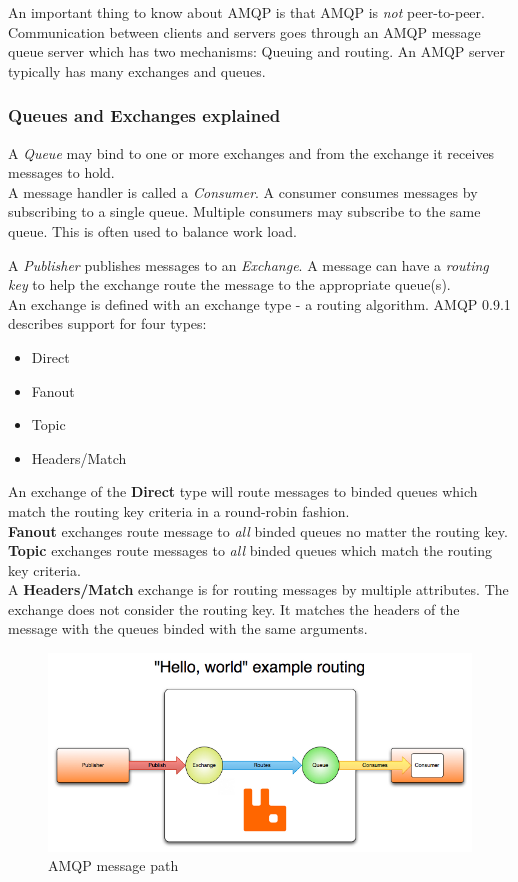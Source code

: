 An important thing to know about AMQP is that AMQP is \textit{not} peer-to-peer. Communication between clients and servers goes through an AMQP message queue server which has two mechanisms: Queuing and routing. An AMQP server typically has many exchanges and queues.
\subsubsection{Queues and Exchanges explained}
A \textit{Queue} may bind to one or more exchanges and from the exchange it receives messages to hold.\\
A message handler is called a \textit{Consumer}. A consumer consumes messages by subscribing to a single queue. Multiple consumers may subscribe to the same queue. This is often used to balance work load.

A \textit{Publisher} publishes messages to an \textit{Exchange}. A message can have a \textit{routing key} to help the exchange route the message to the appropriate queue(s).\\
An exchange is defined with an exchange type - a routing algorithm. AMQP 0.9.1 describes support for four types\cite{Amqp091References}:
\begin{itemize}
\item Direct
\item Fanout
\item Topic
\item Headers/Match
\end{itemize}
An exchange of the \textbf{Direct} type will route messages to binded queues which match the routing key criteria in a round-robin fashion.\\
\textbf{Fanout} exchanges route message to \textit{all} binded queues no matter the routing key.\\
\textbf{Topic} exchanges route messages to \textit{all} binded queues which match the routing key criteria.\\
A \textbf{Headers/Match} exchange is for routing messages by multiple attributes. The exchange does not consider the routing key. It matches the headers of the message with the queues binded with the same arguments\cite{AmqpConcepts}.
\begin{figure}[H]
  \includegraphics[width=\textwidth]{illustrations/publisher-exchange-queue-consumer.png}
  \caption{AMQP message path\cite{AmqpConcepts}}
\end{figure}
